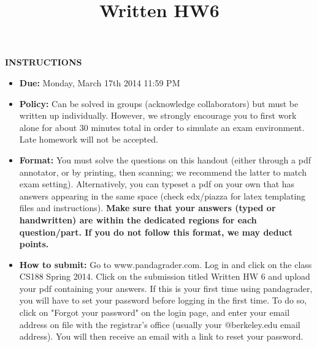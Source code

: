 \documentclass[twoside]{article}
\title{Written HW6}
\begin{document}
\thispagestyle{empty}
\maketitle


\smallskip
\smallskip
\textbf{INSTRUCTIONS}

\begin{itemize}
\item \textbf{Due:} Monday, March 17th 2014 11:59 PM
\item \textbf{Policy:} Can be solved in groups (acknowledge collaborators) but must
be written up individually. However,
we strongly encourage you to first work alone for about 30 minutes total in order to simulate an exam environment.  Late homework
will not be accepted.
\item \textbf{Format:}
You must solve the questions on this handout (either through a pdf annotator, or by printing, then scanning; we recommend the latter to match exam setting). Alternatively, you can typeset a pdf on your own that has answers appearing in the same space (check edx/piazza for latex templating files and instructions).
\textbf{Make sure that your answers (typed or handwritten) are within the
dedicated regions for each question/part.  If you do not follow this format, we may deduct points.}

\item \textbf{How to submit:}  Go to www.pandagrader.com. Log in and click on the
class CS188 Spring 2014. Click
on the submission titled Written HW 6 and upload your pdf containing your answers. If this is your first time using
pandagrader, you will have to set your password before logging in the
first time.  To do so, click on "Forgot your password" on the login
page, and enter your email address on file with the registrar's office
(usually your @berkeley.edu email address). You will then receive an
email with a link to reset your password.

\end{itemize}
\end{document}
